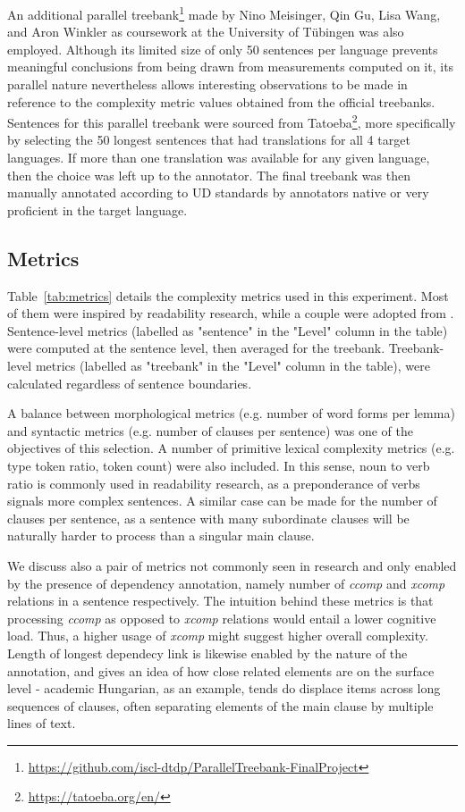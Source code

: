 \documentclass[11pt]{article}
\begin{document}
An additional parallel treebank\footnote{\url{https://github.com/iscl-dtdp/ParallelTreebank-FinalProject}} made by Nino Meisinger, Qin Gu, Lisa Wang, and Aron Winkler as coursework at the University of Tübingen was also employed. Although its limited size of only 50 sentences per language prevents meaningful conclusions from being drawn from measurements computed on it, its parallel nature nevertheless allows interesting observations to be made in reference to the complexity metric values obtained from the official treebanks. Sentences for this parallel treebank were sourced from Tatoeba\footnote{\url{https://tatoeba.org/en/}}, more specifically by selecting the 50 longest sentences that had translations for all 4 target languages. If more than one translation was available for any given language, then the choice was left up to the annotator. The final treebank was then manually annotated according to UD standards by annotators native or very proficient in the target language.

\subsection{Metrics}



Table~\ref{tab:metrics} details the complexity metrics used in this experiment. Most of them were inspired by readability research, while a couple were adopted from \citep{berdicevskis-etal-2018-using}. Sentence-level metrics (labelled as "sentence" in the "Level" column in the table) were computed at the sentence level, then averaged for the treebank. Treebank-level metrics (labelled as "treebank" in the "Level" column in the table), were calculated regardless of sentence boundaries.

A balance between morphological metrics (e.g. number of word forms per lemma) and syntactic metrics (e.g. number of clauses per sentence) was one of the objectives of this selection. A number of primitive lexical complexity metrics (e.g. type token ratio, token count) were also included. In this sense, noun to verb ratio is commonly used in readability research, as a preponderance of verbs signals more complex sentences. A similar case can be made for the number of clauses per sentence, as a sentence with many subordinate clauses will be naturally harder to process than a singular main clause.

We discuss also a pair of metrics not commonly seen in research and only enabled by the presence of dependency annotation, namely number of \emph{ccomp} and \emph{xcomp} relations in a sentence respectively. The intuition behind these metrics is that processing \emph{ccomp} as opposed to \emph{xcomp} relations would entail a lower cognitive load. Thus, a higher usage of \emph{xcomp} might suggest higher overall complexity. Length of longest dependecy link is likewise enabled by the nature of the annotation, and gives an idea of how close related elements are on the surface level - academic Hungarian, as an example, tends do displace items across long sequences of clauses, often separating elements of the main clause by multiple lines of text.
\end{document}
